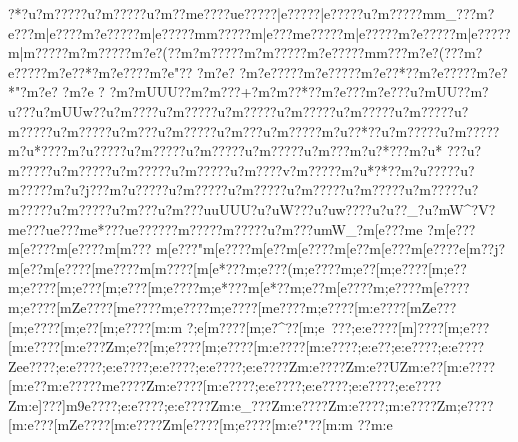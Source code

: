 {{{{{{{{{{{{{{{{{{{{{{{{{{{{{{{{{{{{{{{{{{{{{{{{{{{{{{{{{{{{{{{{{{{{{{{{{{{{{{{{{{{{{{{{{{{{{{{{{{{{{{{{{{{{{{{{{{{{{{{{{{{{{{{{{{{{{{{{{{{{{{{{{{{{{{{{{{{{{{{{{{{{{{{{{{{{{{{{{{{{{{{{{{{{{{{{{{{{{{{{{{{{{{{{{{{{{{{{{{{{{{{{{{{{{{{{{{{{{{{{{{{{{{{{{{{{{{{{{{{{{{{{{{{{{{{{{{{{{{{{{{{{{{{{{{{{{{{{{{{{{{{{{{{{{{{{{{{{{{{{{{{{{{{{{{{{{{{{{{{{{{{{{{{{{{{{{{{{{{{{{{{{{{{{{{{{{{{{{{{{{{{{{{{{{{{{{{{{{{{{{{{{{{{{{{{{{{{{{{{{{{{{{{{{{{{{{{{{{{{{{{{{{{{{{{{{{{{{{{{{{{{{{{{{{{{{{{{{{{{{{{{{{{{{{{{{{{{{{{{{{{{{{{{{{{{{{{{{{{{{{{{{{{{{{{{{{{{{{{{{{{{{{{{{{{{{{{{{{{{{{{{{{{{{{{{{{{{{{{{{{{{{{{{{{{{{{{{{{{{{{{{{{{{{{{{{{{{{{{{{{{{{{{{{{{{{{{{{{{{{{{{{{{{{{{{{{{{{{{{{{{{{{{{{{{{{{{{{{{{{{{{{{{{{{{{{{{{{{{{{{{{{{{{{{{{{{{{{{{{{{{{{{{{{{{{{{{{{{{{{{{{{{{{{{{{{{{{{{{{{{{{{{{{{{{{{{{{{{{{{{{{{{{{{{{{{{{{{{{{{{{{{{{{{{{{{{{{{{{{{{{{{{{{{{{{{{{{{{{{{{{{{{{{{{{{{{{{{{{{{{{{{{{{{{{{{{{{{?*?u?m?????u?m?????u?m??m{e??? ?u{e?????}|e?????}|e?????u?m?????m{m_???{m?e???m|e????{m?e?????m|e?????m{m?????m|e???m{e?????m|e?????m?e?????m|e?????m|m?????m?m?????m?e?(??m?m?????m?m?????m?e?????m{m???m?e?(???m?e?????m?e??* ?m?e? ???m?e"?? ?m?e? 
?m?e?????m?e?????m?e??*??m?e?????m?e?*"?m?e? 
?m?e ?  ?m?mUUU??m?m???+?m?m??*??m?e  ???m?e??  ?u?mUU??m?u ???u?mUUw??u?m????u?m?????u?m?????u?m?????u?m?????u?m?????u?m?????u?m?????u?m???u?m?????u?m???u?m?????m?u??*??u?m?????u?m?????m?u*????m?u?????u?m?????u?m?????u?m?????u?m???m?u?*???m?u*
???u?m?????u?m?????u?m?????u?m?????u?m????v?m?????m?u*?*??m?u?????u?m?????m?u?j???m?u?????u?m?????u?m?????u?m?????u?m?????u?m?????u?m?????u?m?????u?m???u?m   ??}?uuUUU?u?uW???u?uw????u?u??_?u?mW^?V?m{e??  ?u{e???{m{e* ???u{e?????}?m????}?m?????u?m? ??u{mW_?{m[e??? {m{e
?{m[e??? {m[e????{m[e????{m[m???
{m[e???"{m[e????{m[e??{m[e????{m[e??{m[e???{m[e????{e[m??j?{m[e??{m[e????[m{e????{m[m????[m[e*???{m;e???({m;e????{m;e??[m;e????[m;e??{m;e????[m;e???[m;e???[m;e????{m;e*???{m[e *??{m;e  ??{m[e????{m;e????{m[e????{m;e????[mZe????[m{e????{m;e????{m;e????[m{e????{m;e????[m:e????[mZe??? [m;e????[m;e??[m;e????[m:m
?  ;e[m????[m;e?^??[m;e~???;e:e????[m]????[m;e?}??[m:e????[m:e???Zm;e??[m;e????[m;e????[m:e????[m:e????;e:e??;e:e????;e:e????Zee????;e:e????;e:e????;e:e????;e:e????;e:e????Zm:e????Zm:e}??UZm:e??[m:e????[m:e??{m:e?????me????Zm:e????[m:e????;e:e????;e:e????;e:e????;e:e????Zm:e]???]m9e????;e:e????;e:e????Zm:e_???Zm:e????Zm:e????;m:e????Zm;e????[m:e???[mZe????[m:e????Zm[e????[m;e????[m:e?"??[m:m
?? {m:e

}}}}}}}}}}}}}}}}}}}}}}}}}}}}}}}}}}}}}}}}}}}}}}}}}}}}}}}}}}}}}}}}}}}}}}}}}}}}}}}}}}}}}}}}}}}}}}}}}}}}}}}}}}}}}}}}}}}}}}}}}}}}}}}}}}}}}}}}}}}}}}}}}}}}}}}}}}}}}}}}}}}}}}}}}}}}}}}}}}}}}}}}}}}}}}}}}}}}}}}}}}}}}}}}}}}}}}}}}}}}}}}}}}}}}}}}}}}}}}}}}}}}}}}}}}}}}}}}}}}}}}}}}}}}}}}}}}}}}}}}}}}}}}}}}}}}}}}}}}}}}}}}}}}}}}}}}}}}}}}}}}}}}}}}}}}}}}}}}}}}}}}}}}}}}}}}}}}}}}}}}}}}}}}}}}}}}}}}}}}}}}}}}}}}}}}}}}}}}}}}}}}}}}}}}}}}}}}}}}}}}}}}}}}}}}}}}}}}}}}}}}}}}}}}}}}}}}}}}}}}}}}}}}}}}}}}}}}}}}}}}}}}}}}}}}}}}}}}}}}}}}}}}}}}}}}}}}}}}}}}}}}}}}}}}}}}}}}}}}}}}}}}}}}}}}}}}}}}}}}}}}}}}}}}}}}}}}}}}}}}}}}}}}}}}}}}}}}}}}}}}}}}}}}}}}}}}}}}}}}}}}}}}}}}}}}}}}}}}}}}}}}}}}}}}}}}}}}}}}}}}}}}}}}}}}}}}}}}}}}}}}}}}}}}}}}}}}}}}}}}}}}}}}}}}}}}}}}}}}}}}}}}}}}}}}}}}}}}}}}}}}}}}}}}}}}}}}}}}}}}}}}}}}}}}}}}}}}}}}}}}}}}}}}}}}}}}}}}}}}}}}}}}}}}}}}}}}}}}}}}}}}}}}}}}}}}}}}}}}}}}}}}}}}}}}}}}}}}}}}}}}}}}}}}}}}}}}}}}}}}}}}}}}}}}}}}}}}}}}}}}}}}}}}}}}}}}}}}}}}}
